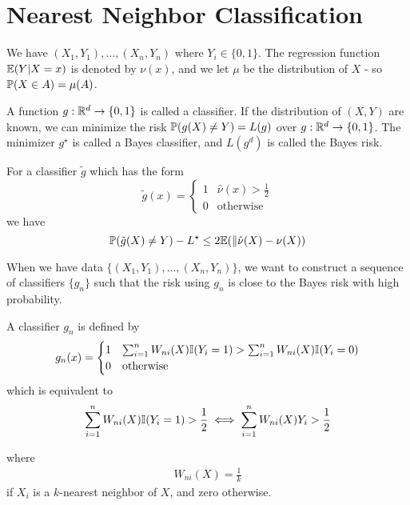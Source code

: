 \chapter{Nearest Neighbor Classification}
\label{cha:near-neighb-class}

We have $(X_{1}, Y_{1}), \dots, (X_{n}, Y_{n})$ where $Y_{i} \in \{ 0,
1 \}$.  The regression function $\E{Y | X = x}$ is denoted by
$\nu(x)$, and we let $\mu$ be the distribution of $X$ - so $\Prob{X
  \in A} = \mu(A)$.

A function $g: \mathbb{R}^{d} \rightarrow \{ 0, 1 \}$ is called a classifier.
If the distribution of $(X, Y)$ are known, we can minimize the risk
$\Prob{g(X) \neq Y} = L(g)$ over $g: \mathbb{R}^{d} \rightarrow \{ 0, 1 \}$.
The minimizer $g^{\star}$ is called a Bayes classifier, and $L(g^{d})$
is called the Bayes risk.

\begin{lem}
  For a classifier $\tilde g$ which has the form
  \begin{equation}
    \label{eq:90}
    \tilde g(x) =
    \begin{cases}
      1 & \hat \nu(x) > \frac{1}{2} \\
      0 & \text{otherwise}
    \end{cases}
  \end{equation} we have
  \begin{equation}
    \label{eq:93}
    \Prob{\tilde g(X) \neq Y} - L^{\star} \leq 2 \E{\| \hat \nu(X) - \nu(X)}
  \end{equation}
\end{lem}

When we have data $\{ (X_{1}, Y_{1}), \dots, (X_{n}, Y_{n}) \}$, we
want to construct a sequence of classifiers $\{ g_{n} \}$ such that
the risk using $g_{n}$ is close to the Bayes risk with high
probability.

\begin{defn}
  \label{defn:nearest_neighbour_classification:1}
  A \knn classifier $g_{n}$ is defined by
  \begin{align}
    \label{eq:94}
    g_{n}(x) =
    \begin{cases}
      1 & \sum_{i=1}^{n} W_{ni}(X) \I{Y_{i} = 1} > \sum_{i=1}^{n}
      W_{ni}(X) \I{Y_{i} = 0} \\
      0 & \text{otherwise}
    \end{cases}
  \end{align}
  which is equivalent to
  \begin{align}
    \label{eq:96}
    \sum_{i=1}^{n} W_{ni}(X) \I{Y_{i} = 1} > \frac{1}{2} \iff
    \sum_{i=1}^{n} W_{ni}(X) Y_{i} > \frac{1}{2}
  \end{align}
  
  where
  \begin{align}
    \label{eq:95}
    W_{ni}(X) = \frac{1}{k} 
  \end{align} if $X_{i}$ is a $k$-nearest neighbor of $X$, and zero otherwise.
\end{defn}


